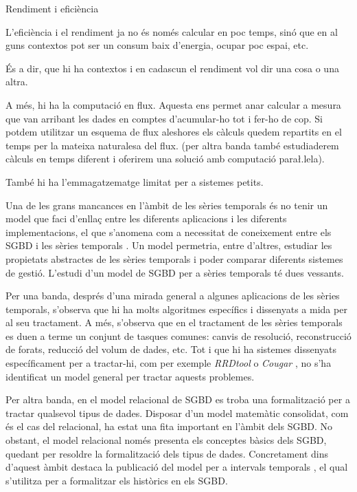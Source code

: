 Rendiment i eficiència

L'eficiència i el rendiment ja no és només calcular en poc temps, sinó que en al
guns contextos pot ser un consum baix d'energia, ocupar poc espai, etc.

És a dir, que hi ha contextos i en cadascun el rendiment vol dir una cosa o una 
altra.


A més, hi ha la computació en flux. Aquesta ens permet anar calcular a mesura que van arribant les dades en comptes d'acumular-ho tot i fer-ho de cop. Si potdem utilitzar un esquema de flux aleshores els càlculs quedem repartits en el temps per la mateixa naturalesa del flux. (per altra banda també estudiaderem càlculs en temps diferent i oferirem una solució amb computació para\l.lela).


També hi ha l'emmagatzematge limitat per a sistemes petits.

Una de les grans mancances en l'àmbit de les sèries temporals és no
tenir un model que faci d'enllaç entre les diferents aplicacions i les
diferents implementacions, el que s'anomena com a necessitat de
coneixement entre els SGBD i les sèries
temporals \parencite{zhang11,stonebraker09:scidb}. Un model permetria,
entre d'altres, estudiar les propietats abstractes de les sèries
temporals i poder comparar diferents sistemes de gestió.
L'estudi d'un model de SGBD per a sèries temporals té dues vessants.

Per una banda, després d'una mirada general a algunes aplicacions de
les sèries temporals, s'observa que hi ha molts algoritmes específics
i dissenyats a mida per al seu tractament. A més, s'observa que en el
tractament de les sèries temporals es duen a terme un conjunt de
tasques comunes: canvis de resolució, reconstrucció de forats,
reducció del volum de dades, etc.  Tot i que hi ha sistemes dissenyats
específicament per a tractar-hi, com per exemple
\emph{RRDtool} \parencite{rrdtool} o \emph{Cougar} \parencite{fung02},
no s'ha identificat un model general per tractar aquests problemes.

Per altra banda, en el model relacional de SGBD es troba una
formalització per a tractar qualsevol tipus de dades. Disposar d'un
model matemàtic consolidat, com és el cas del relacional, ha estat una
fita important en l'àmbit dels SGBD.  No obstant, el model relacional
només presenta els conceptes bàsics dels SGBD, quedant per resoldre la
formalització dels tipus de dades. Concretament dins d'aquest àmbit
destaca la publicació del model per a intervals
temporals \parencite{date02:_tempor_data_relat_model}, el qual
s'utilitza per a formalitzar els històrics en els SGBD.

